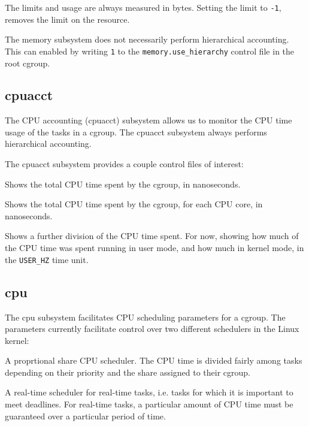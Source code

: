 The limits and usage are always measured in bytes. Setting the limit to
\texttt{-1}, removes the limit on the resource.

The memory subsystem does not necessarily perform hierarchical accounting. This
can enabled by writing \texttt{1} to the \texttt{memory.use\_hierarchy} control
file in the root cgroup.

\subsection{cpuacct}

The CPU accounting (cpuacct) subsystem allows us to monitor the CPU time usage
of the tasks in a cgroup\cite{cpuacct.txt}. The cpuacct subsystem always
performs hierarchical accounting.

The cpuacct subsystem provides a couple control files of interest:

\begin{description}[\setleftmargin{0.2in}\breaklabel\setlabelstyle{\tt}]

\item[cpuacct.usage] Shows the total CPU time spent by the cgroup, in
nanoseconds.

\item[cpuacct.usage\_percpu] Shows the total CPU time spent by the cgroup, for
each CPU core, in nanoseconds.

\item[cpuacct.stat] Shows a further division of the CPU time spent. For now,
showing how much of the CPU time was spent running in user mode, and how much
in kernel mode, in the \texttt{USER\_HZ} time unit.

\end{description}

\subsection{cpu}

The cpu subsystem facilitates CPU scheduling parameters for a
cgroup\cite{sched-design-cfs.txt,sched-bwc.txt,sched-rt-group.txt}. The
parameters currently facilitate control over two different schedulers in the
Linux kernel:

\begin{description}[\setleftmargin{0.2in}\breaklabel\setlabelstyle{\it}]

\item[Completely Fair Scheduler (CFS)] A proprtional share CPU scheduler. The
CPU time is divided fairly among tasks depending on their priority
and the share assigned to their cgroup.

\item[Real-Time Scheduler (RT)] A real-time scheduler for real-time tasks, i.e.
tasks for which it is important to meet deadlines. For real-time tasks, a
particular amount of CPU time must be guaranteed over a particular period of
time.

\end{description}


